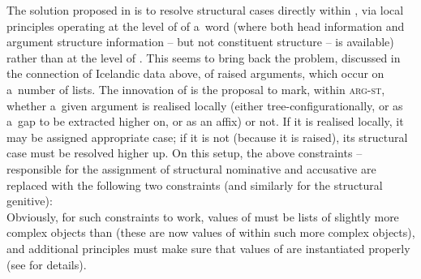 \documentclass[output=paper]{langsci/langscibook}
\begin{document}
The solution proposed in \citealt{prze:96,Prze99,Prze99b} is to resolve structural cases directly within , via local principles operating at the level of  of a~word (where both head information and argument structure information – but not constituent structure – is available) rather than at the level of .  This seems to bring back the problem, discussed in the connection of Icelandic data above, of raised arguments, which occur on a~number of  lists.  The innovation of \citealt{prze:96,Prze99,Prze99b} is the proposal to mark, within \textsc{arg-st}, whether a~given argument is realised locally (either tree-con\-fi\-gu\-ra\-tio\-nal\-ly, or as a~gap to be extracted higher on, or as an affix) or not.  If it is realised locally, it may be assigned appropriate case; if it is not (because it is raised), its structural case must be resolved higher up.  On this setup, the above constraints – responsible for the assignment of structural nominative and accusative are replaced with the following two constraints (and similarly for the structural genitive):
\ea
\label{nonc:cp:germ1}
  \impl 
\z
\ea \label{nonc:cp:germ2}
  \impl\\ 
\z
Obviously, for such constraints to work, values of  must be lists of slightly more complex objects than  (these are now values of  within such more complex objects), and additional principles must make sure that values of  are instantiated properly (see \citealt[78–79]{Prze99b} for details).
\end{document}
